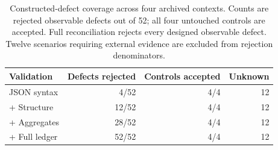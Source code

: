 \begin{table}[t]
\centering\small
\caption{Constructed-defect coverage across four archived contexts. Counts are rejected observable defects out of 52; all four untouched controls are accepted. Full reconciliation rejects every designed observable defect. Twelve scenarios requiring external evidence are excluded from rejection denominators.}
\label{tab:mutation-validation}
\begin{tabular}{lrrr}
\toprule
Validation & Defects rejected & Controls accepted & Unknown\\
\midrule
JSON syntax & 4/52 & 4/4 & 12\\
+ Structure & 12/52 & 4/4 & 12\\
+ Aggregates & 28/52 & 4/4 & 12\\
+ Full ledger & 52/52 & 4/4 & 12\\
\bottomrule
\end{tabular}
\end{table}
